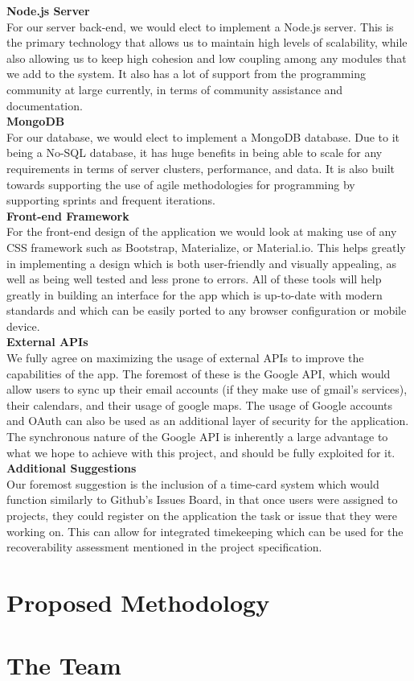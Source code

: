 \documentclass[12pt]{article}
\begin{document}
	\textbf{Node.js Server}\\
	For our server back-end, we would elect to implement a Node.js server. This is the primary technology that allows us to maintain high levels of scalability, while also allowing us to keep high cohesion and low coupling among any modules that we add to the system. It also has a lot of support from the programming community at large currently, in terms of community assistance and documentation. \\
	
	\textbf{MongoDB}\\
	For our database, we would elect to implement a MongoDB database. Due to it being a No-SQL database, it has huge benefits in being able to scale for any requirements in terms of server clusters, performance, and data. It is also built towards supporting the use of agile methodologies for programming by supporting sprints and frequent iterations.\\
	
	\newpage
	\textbf{Front-end Framework}\\
	For the front-end design of the application we would look at making use of any CSS framework such as Bootstrap, Materialize, or Material.io. This helps greatly in implementing a design which is both user-friendly and visually appealing, as well as being well tested and less prone to errors. All of these tools will help greatly in building an interface for the app which is up-to-date with modern standards and which can be easily ported to any browser configuration or mobile device.\\
	
	\textbf{External APIs}\\
	We fully agree on maximizing the usage of external APIs to improve the capabilities of the app. The foremost of these is the Google API, which would allow users to sync up their email accounts (if they make use of gmail's services), their calendars, and their usage of google maps. The usage of Google accounts and OAuth can also be used as an additional layer of security for the application. The synchronous nature of the Google API is inherently a large advantage to what we hope to achieve with this project, and should be fully exploited for it.\\
	
	\textbf{Additional Suggestions}\\
	Our foremost suggestion is the inclusion of a time-card system which would function similarly to Github's Issues Board, in that once users were assigned to projects, they could register on the application the task or issue that they were working on. This can allow for integrated timekeeping which can be used for the recoverability assessment mentioned in the project specification.\\

	\newpage
	\section{Proposed Methodology}
	
	\newpage
	\section{The Team}
	
\end{document}
